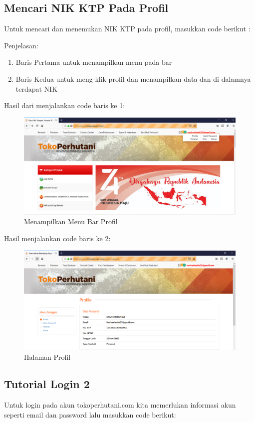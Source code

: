 \newpage
\subsection{Mencari NIK KTP Pada Profil}
Untuk mencari dan menemukan NIK KTP pada profil, masukkan code berikut :


Penjelasan:
\begin{enumerate}
	\item Baris Pertama untuk menampilkan menu pada bar
	\item Baris Kedua untuk meng-klik profil dan menampilkan data dan di dalamnya terdapat NIK
\end{enumerate}

Hasil dari menjalankan code baris ke 1:
\begin{figure}[h]
	\centering
	\includegraphics[scale=0.25]{figures/caripropil}
	\caption{Menampilkan Menu Bar Profil}
\end{figure}

Hasil menjalankan code baris ke 2:
\begin{figure}[h]
	\centering
	\includegraphics[scale=0.25]{figures/cari}
	\caption{Halaman Profil}
\end{figure}

\newpage
\subsection{Tutorial Login 2}
Untuk login pada akun tokoperhutani.com kita memerlukan informasi akun seperti email dan password lalu masukkan code berikut:


